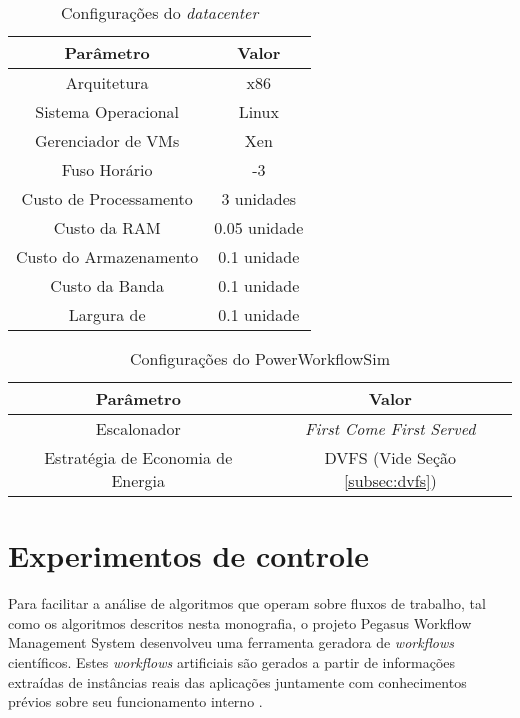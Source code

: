 

\begin{table}
	\centering
    \begin{tabular}{|c|c|}
    \hline
    \textbf{Parâmetro}     & \textbf{Valor}     \\ \hline
    Arquitetura            & x86          \\
    Sistema Operacional    & Linux        \\
    Gerenciador de VMs     & Xen          \\
    Fuso Horário           & -3           \\
    Custo de Processamento & 3 unidades   \\
    Custo da RAM           & 0.05 unidade \\
    Custo do Armazenamento & 0.1 unidade  \\
    Custo da Banda         & 0.1 unidade  \\ \hline
    Largura de          & 0.1 unidade  \\ \hline
    \end{tabular}
    \caption {Configurações do \emph{datacenter}}
    \label{tab:configuracao_datacenter}
\end{table}



\begin{table}
	\centering
    \begin{tabular}{|c|c|}
    \hline
    \textbf{Parâmetro}                & \textbf{Valor}     \\ \hline
    Escalonador                       & \emph{First Come First Served}    \\
    Estratégia de Economia de Energia & DVFS (Vide Seção \ref{subsec:dvfs}) \\ \hline
    \end{tabular}
    \caption {Configurações do PowerWorkflowSim}
    \label{tab:configuracao_powerworkflowsim}
\end{table}


\section{Experimentos de controle}
\label{sec:experimentos-controle}
Para facilitar a análise de algoritmos que operam sobre fluxos de trabalho,
tal como os algoritmos descritos nesta monografia, o projeto Pegasus Workflow
Management System desenvolveu uma ferramenta geradora de \emph{workflows}
científicos. Estes \emph{workflows} artificiais são gerados a partir de
informações extraídas de instâncias reais das aplicações juntamente com
conhecimentos prévios sobre seu funcionamento interno
\cite{pegasus:workflowgenerator}.

